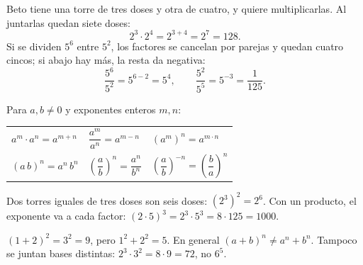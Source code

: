 \documentclass[11pt,a4paper]{article}
\let\nivelzuka\nivel
\renewcommand{\nivel}[2]{\Needspace{8\baselineskip}\nivelzuka{#1}{#2}}
\newcommand{\bloque}[4]{\draw[zink,fill=#3!45,rounded corners=1.5pt] (#1,#2) rectangle ++(0.8,0.5); \node[font=\footnotesize] at (#1+0.4,#2+0.25) {$#4$};}
\begin{document}

\begin{minipage}[c]{0.56\linewidth}
Beto tiene una torre de tres doses y otra de cuatro, y quiere multiplicarlas. Al juntarlas quedan siete doses:
\[ 2^{3}\cdot2^{4}=2^{3+4}=2^{7}=128. \]
Si se dividen $5^{6}$ entre $5^{2}$, los factores se cancelan por parejas y quedan cuatro cincos; si abajo hay más,
la resta da negativa:
\[ \frac{5^6}{5^2}=5^{6-2}=5^{4},\qquad \frac{5^{2}}{5^{5}}=5^{-3}=\frac1{125}. \]
\end{minipage}\hfill
\begin{minipage}[c]{0.4\linewidth}\centering
{}
\end{minipage}

\begin{propiedad}
Para $a,b\neq0$ y exponentes enteros $m,n$:
\begin{center}
\renewcommand{\arraystretch}{1.6}
\begin{tabular}{@{}l@{\qquad}l@{\qquad}l@{}}
$a^{m}\cdot a^{n}=a^{m+n}$ & $\dfrac{a^{m}}{a^{n}}=a^{m-n}$ & $\left(a^{m}\right)^{n}=a^{m\cdot n}$\\
$(a\,b)^{n}=a^{n}\,b^{n}$ & $\left(\dfrac ab\right)^{n}=\dfrac{a^{n}}{b^{n}}$ & $\left(\dfrac ab\right)^{-n}=\left(\dfrac ba\right)^{n}$
\end{tabular}
\end{center}
\end{propiedad}
Dos torres iguales de tres doses son seis doses: $(2^{3})^{2}=2^{6}$. Con un producto, el exponente va a cada factor:
$(2\cdot5)^{3}=2^{3}\cdot5^{3}=8\cdot125=1000$.

\begin{ojo}
$(1+2)^{2}=3^{2}=9$, pero $1^{2}+2^{2}=5$. En general $(a+b)^{n}\neq a^{n}+b^{n}$. Tampoco se juntan bases distintas:
$2^{3}\cdot3^{2}=8\cdot9=72$, no $6^{5}$.
\end{ojo}
\end{document}
